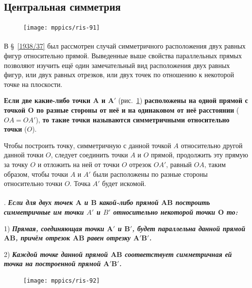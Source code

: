 \documentclass[twoside]{book}
\begin{document}
\subsection*{Центральная симметрия}

\begin{figure}
\vskip-15mm
\centering
\texttt{[image: mppics/ris-91]}
\caption{}\label{1938/ris-91}
\end{figure}

\paragraph{}\label{1938/84}
В §~\ref{1938/37} был рассмотрен случай симметричного расположения двух равных фигур относительно прямой.
Выведенные выше свойства параллельных прямых позволяют изучить ещё один замечательный вид расположения двух равных фигур, или двух равных отрезков, или двух точек по отношению к некоторой точке на плоскости.

\textbf{Если две какие-либо точки $\bm{A}$ и $\bm{A'}$} (рис.~\ref{1938/ris-91}) \textbf{расположены на одной прямой с точкой $\bm{O}$ по разные стороны от неё и на одинаковом от неё расстоянии} ($OA=OA'$), \textbf{то такие точки называются симметричными относительно точки} ($O$).

Чтобы построить точку, симметричную с данной точкой $A$ относительно другой данной точки $O$, следует соединить точки $A$ и $O$ прямой, продолжить эту прямую за точку $O$ и отложить на ней от точки $O$ отрезок $OA'$, равный $OA$, таким образом, чтобы точки $A$ и $A'$ были расположены по разные стороны относительно точки $O$.
Точка $A'$ будет искомой.

\paragraph{}\label{1938/85}
.
\textbf{\emph{Если для двух точек $\bm{A}$ и $\bm{B}$ какой-либо прямой $\bm{AB}$ построить симметричные им точки $A'$ и $B'$ относительно некоторой точки $\bm{O}$ то:}}

1) \textbf{\emph{Прямая, соединяющая точки $\bm{A'}$ и $\bm{B'}$, будет параллельна данной прямой $\bm{AB}$, причём отрезок $\bm{AB}$ равен отрезку $\bm{A'B'}$.}}

2) \textbf{\emph{Каждой точке данной прямой $\bm{AB}$ соответствует симметричная ей точка на построенной прямой $\bm{A'B'}$.}}

\begin{figure}
\centering
\texttt{[image: mppics/ris-92]}
\caption{}\label{1938/ris-92}
\end{figure}
\end{document}

